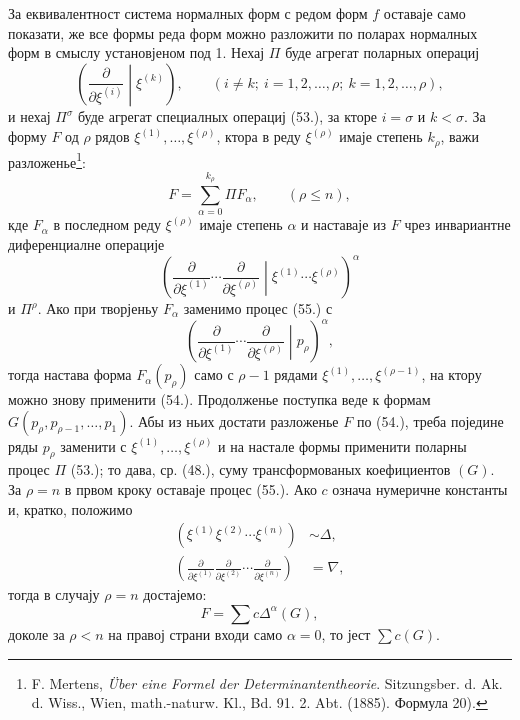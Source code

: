 \documentclass[11pt]{article}
\begin{document}
За еквивалентност система нормалных форм с редом форм $f$ оставаје само показати, же все формы реда форм можно разложити по поларах нормалных форм в смыслу установјеном под 1. Нехај $\Pi$ буде агрегат поларных операциј
\begin{equation}
 \left(\frac{\partial}{\partial\xi^{(i)}}\middle|\xi^{(k)}\right),
 \qquad (i\ne k;\ i=1,2,\ldots,\rho;\ k=1,2,\ldots,\rho),
\tag{53}
\end{equation}
и нехај $\Pi^\sigma$ буде агрегат специалных операциј (53.), за кторе $i=\sigma$ и $k<\sigma$. За форму $F$ од $\rho$ рядов $\xi^{(1)},\ldots,\xi^{(\rho)}$, ктора в реду $\xi^{(\rho)}$ имаје степень $k_\rho$, важи разложенье\footnote{F. Mertens, \emph{\"Uber eine Formel der Determinantentheorie}. Sitzungsber. d. Ak. d. Wiss., Wien, math.-naturw. Kl., Bd. 91. 2. Abt. (1885). Формула 20).}:
\begin{equation}
 F=\sum_{\alpha=0}^{k_\rho}\Pi F_\alpha,
 \qquad(\rho\le n),
\tag{54}
\end{equation}
кде $F_\alpha$ в последном реду $\xi^{(\rho)}$ имаје степень $\alpha$ и наставаје из $F$ чрез инвариантне диференциалне операције
\begin{equation}
 \left(\frac{\partial}{\partial\xi^{(1)}}\cdots\frac{\partial}{\partial\xi^{(\rho)}}\middle|\xi^{(1)}\cdots\xi^{(\rho)}\right)^\alpha
\tag{55}
\end{equation}
и $\Pi^\rho$. Ако при творјеньу $F_\alpha$ заменимо процес (55.) с
\begin{equation}
 \left(\frac{\partial}{\partial\xi^{(1)}}\cdots\frac{\partial}{\partial\xi^{(\rho)}}\middle|p_\rho\right)^\alpha,
\tag{56}
\end{equation}
тогда настава форма $F_\alpha(p_\rho)$ само с $\rho-1$ рядами $\xi^{(1)},\ldots,\xi^{(\rho-1)}$, на ктору можно знову применити (54.). Продолженье поступка веде к формам $G(p_\rho,p_{\rho-1},\ldots,p_1)$. Абы из ньих достати разложенье $F$ по (54.), треба поједине ряды $p_\rho$ заменити с $\xi^{(1)},\ldots,\xi^{(\rho)}$ и на настале формы применити поларны процес $\Pi$ (53.); то дава, ср. (48.), суму трансформованых коефициентов $(G)$. За $\rho=n$ в првом кроку оставаје процес (55.). Ако $c$ означа нумеричне константы и, кратко, положимо
\begin{equation}
\begin{aligned}
(\xi^{(1)}\xi^{(2)}\cdots\xi^{(n)})&\sim\Delta,\\
\left(\frac{\partial}{\partial\xi^{(1)}}\frac{\partial}{\partial\xi^{(2)}}\cdots\frac{\partial}{\partial\xi^{(n)}}\right)&=\nabla,
\end{aligned}
\tag{57}
\end{equation}
тогда в случају $\rho=n$ достајемо:
\begin{equation}
 F=\sum c\Delta^\alpha(G),
\tag{58}
\end{equation}
доколе за $\rho<n$ на правој страни входи само $\alpha=0$, то јест $\sum c(G)$.
\end{document}

